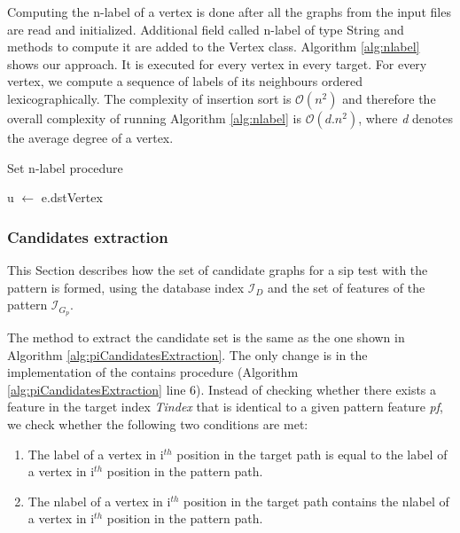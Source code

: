 \documentclass{l4proj}
\newcommand{\fancyI}{\mathcal{I}}
\begin{document}
Computing the n-label of a vertex is done after all the graphs from the input files are read and initialized. Additional field called n-label of type String and methods to compute it are added to the Vertex class. Algorithm \ref{alg:nlabel} shows our approach. It is executed for every vertex in every target. For every vertex, we compute a sequence of labels of its neighbours ordered lexicographically. The complexity of insertion sort is $\mathcal{O}(n^{2})$ \cite{backtracking-algorithms} and therefore the overall complexity of running Algorithm \ref{alg:nlabel} is $\mathcal{O}(d.n^{2})$, where \emph{d} denotes the average degree of a vertex.
 
\begin{algorithm}
\centering
\caption{Set n-label procedure}
\label{alg:nlabel}
\begin{algorithmic}[1]
\State u $\gets$ e.dstVertex
\State {} 
\EndFor
\EndProcedure
{} 
\end{algorithmic}
\end{algorithm}

\subsubsection{Candidates extraction}
\label{pi:candExtr}
This Section describes how the set of candidate graphs for a \gls{sip} test with the pattern is formed, using the database index $\fancyI_{D}$ and the set of features of the pattern $\fancyI_{G_{p}}$.

The method to extract the candidate set is the same as the one shown in Algorithm \ref{alg:piCandidatesExtraction}. The only change is in the implementation of the contains procedure (Algorithm \ref{alg:piCandidatesExtraction} line 6). Instead of checking whether there exists a feature in the target index \emph{Tindex} that is identical to a given pattern feature \emph{pf}, we check whether the following two conditions are met:
\begin{enumerate}
\item The label of a vertex in i$^{th}$ position in the target path is equal to the label of a vertex in i$^{th}$ position in the pattern path.
\item The nlabel of a vertex in  i$^{th}$ position in the target path contains the nlabel of a vertex in i$^{th}$ position in the pattern path.
\end{enumerate}
\end{document}
